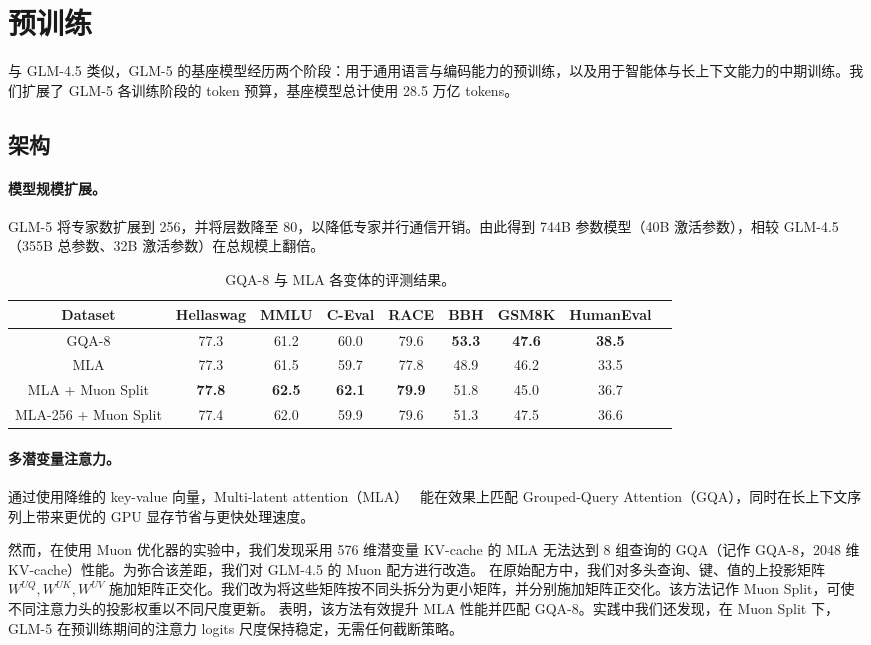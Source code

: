 \section{预训练}
与 GLM-4.5 类似，GLM-5 的基座模型经历两个阶段：用于通用语言与编码能力的预训练，以及用于智能体与长上下文能力的中期训练。我们扩展了 GLM-5 各训练阶段的 token 预算，基座模型总计使用 28.5 万亿 tokens。

\subsection{架构}

\paragraph{模型规模扩展。} GLM-5 将专家数扩展到 256，并将层数降至 80，以降低专家并行通信开销。由此得到 744B 参数模型（40B 激活参数），相较 GLM-4.5（355B 总参数、32B 激活参数）在总规模上翻倍。

\begin{table}[!ht]
    \small
    \centering
    \caption{GQA-8 与 MLA 各变体的评测结果。}
    \begin{tabular}{c|cccccccc}
        \toprule
        Dataset & Hellaswag & MMLU & C-Eval & RACE & BBH & GSM8K & HumanEval \\
        \midrule
        GQA-8 & 77.3 & 61.2 & 60.0 & 79.6 & \textbf{53.3} & \textbf{47.6} & \textbf{38.5} \\
        MLA & 77.3 & 61.5 & 59.7 & 77.8 & 48.9 & 46.2 & 33.5 \\
        MLA + Muon Split & \textbf{77.8} & \textbf{62.5} & \textbf{62.1} & \textbf{79.9} & 51.8 & 45.0 & 36.7\\
        MLA-256 + Muon Split & 77.4 & 62.0 & 59.9 & 79.6 & 51.3 & 47.5 & 36.6 \\
        \bottomrule
    \end{tabular}
    \label{tab:mla}
\end{table}

\paragraph{多潜变量注意力。} 通过使用降维的 key-value 向量，Multi-latent attention（MLA）~\cite{liu2024deepseekv2} 能在效果上匹配 Grouped-Query Attention（GQA），同时在长上下文序列上带来更优的 GPU 显存节省与更快处理速度。

然而，在使用 Muon 优化器的实验中，我们发现采用 576 维潜变量 KV-cache 的 MLA 无法达到 8 组查询的 GQA（记作 GQA-8，2048 维 KV-cache）性能。为弥合该差距，我们对 GLM-4.5 的 Muon 配方进行改造。
在原始配方中，我们对多头查询、键、值的上投影矩阵 $W^{UQ}, W^{UK}, W^{UV}$ 施加矩阵正交化。我们改为将这些矩阵按不同头拆分为更小矩阵，并分别施加矩阵正交化。该方法记作 Muon Split，可使不同注意力头的投影权重以不同尺度更新。 表明，该方法有效提升 MLA 性能并匹配 GQA-8。实践中我们还发现，在 Muon Split 下，GLM-5 在预训练期间的注意力 logits 尺度保持稳定，无需任何截断策略。

